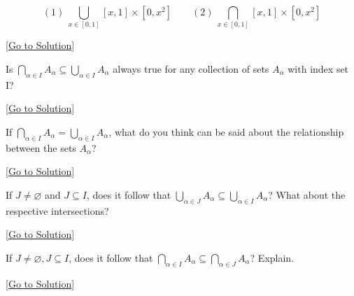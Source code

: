 \begin{exercise}\label{ex:8.10}
    
    $$
    (1)~ \bigcup_{x\in[0,1]}[x,1]\times[0,x^{2}]\quad\quad
    (2)~ \bigcap_{x\in[0,1]}[x,1]\times[0,x^{2}]
    $$
    
\end{exercise}\hyperref[sol:8.10]{[Go to Solution]}

\begin{exercise}\label{ex:8.11}
    Is $\bigcap_{\alpha\in I}A_{\alpha}\subseteq\bigcup_{\alpha\in I}A_{\alpha}$ always true for any collection of sets $A_{\alpha}$ with index set I?
\end{exercise}\hyperref[sol:8.11]{[Go to Solution]}

\begin{exercise}\label{ex:8.12}
    If $\bigcap_{\alpha\in I}A_{\alpha}=\bigcup_{\alpha\in I}A_{\alpha}$, what do you think can be said about the relationship between the sets $A_{\alpha}$?
\end{exercise}\hyperref[sol:8.12]{[Go to Solution]}

\begin{exercise}\label{ex:8.13}
    If $J\ne \varnothing$ and $J\subseteq I$, does it follow that $\bigcup_{\alpha\in J}A_{\alpha}\subseteq\bigcup_{\alpha \in I}A_{\alpha}$? What about the respective intersections?
\end{exercise}\hyperref[sol:8.13]{[Go to Solution]}

\begin{exercise}\label{ex:8.14}
    If $J\ne\varnothing,J\subseteq I$, does it follow that $\bigcap_{\alpha\in I}A_{\alpha}\subseteq\bigcap_{\alpha \in J}A_{\alpha}$? Explain.
\end{exercise}\hyperref[sol:8.14]{[Go to Solution]}